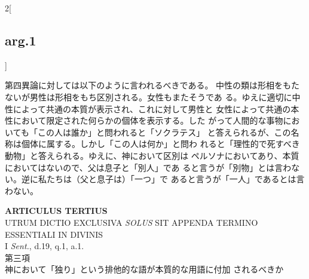 \documentclass[paper=a4paper,fontsize=10pt,jafontsize=9pt,titlepage]{jlreq}
\begin{document}
\begin{paracol}{2}[\subsection{arg.1}]
\switchcolumn

第四異論に対しては以下のように言われるべきである。
中性の類は形相をもたないが男性は形相をもち区別される。女性もまたそうであ
 る。ゆえに適切に中性によって共通の本質が表示され、これに対して男性と
 女性によって共通の本性において限定された何らかの個体を表示する。した
 がって人間的な事物においても「この人は誰か」と問われると「ソクラテス」
 と答えられるが、この名称は個体に属する。しかし「この人は何か」と問わ
 れると「理性的で死すべき動物」と答えられる。ゆえに、神において区別は
 ペルソナにおいてあり、本質においてはないので、父は息子と「別人」であ
 ると言うが「別物」とは言わない。逆に私たちは（父と息子は）「一つ」で
 あると言うが「一人」であるとは言わない。

\end{paracol}
\newpage




\begin{center}
{\Large {\bfseries ARTICULUS TERTIUS}}\\
{\large UTRUM DICTIO EXCLUSIVA {\itshape SOLUS} SIT APPENDA TERMINO
 ESSENTIALI IN DIVINIS}\\
{\footnotesize I {\itshape Sent.}, d.19, q.1, a.1.}\\
{\Large 第三項\\神において「独り」という排他的な語が本質的な用語に付加
 されるべきか}
\end{center}


{}
\setcounter{section}{3}
\setcounter{subsection}{0}
\end{document}
